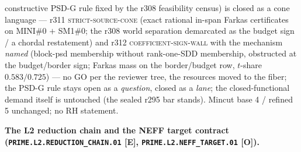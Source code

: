{{constructive PSD-G rule fixed by the r308 feasibility census) is
closed as a cone language} --- r311 \textsc{strict-source-cone}
(exact rational in-span Farkas certificates on MINI\#0 $+$ SM1\#0;
the r308 world separation demarcated as the budget sign / a
chordal restatement) and r312 \textsc{coefficient-sign-wall} with
the mechanism \emph{named} (block-psd membership without
rank-one-SDD membership, obstructed at the budget/border sign;
Farkas mass on the border/budget row, $t$-share $0.583/0.725$) ---
no GO per the reviewer tree, the resources moved to the fiber; the
PSD-G rule stays open as a \emph{question}, closed as a
\emph{lane}; the closed-functional demand itself is untouched (the
sealed r295 bar stands).
Mincut base 4 / refined 5 unchanged; no RH statement.\par}


\par\smallskip\noindent\textbf{The L2 reduction chain and the NEFF
target contract (\texttt{PRIME.L2.\allowbreak REDUCTION\_CHAIN.01}
[E], \texttt{PRIME.L2.\allowbreak NEFF\_TARGET.01} [O]).}
